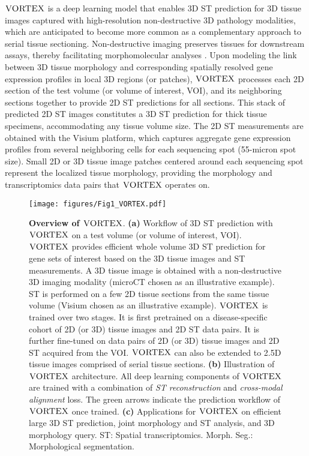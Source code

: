 

$\textsc{VORTEX}$ is a deep learning model that enables 3D ST prediction for 3D tissue images captured with high-resolution non-destructive 3D pathology modalities\cite{liu2021harnessing, song2024analysis, wang20243d}, which are anticipated to become more common as a complementary approach to serial tissue sectioning\cite{kiemen2022coda, braxton20243d}. Non-destructive imaging preserves tissues for downstream assays, thereby facilitating morphomolecular analyses \cite{bishop2024end, li2023feasibility}.
Upon modeling the link between 3D tissue morphology and corresponding spatially resolved gene expression profiles in local 3D regions (or patches), $\textsc{VORTEX}$ processes each 2D section of the test volume (or volume of interest, VOI), and its neighboring sections together to provide 2D ST predictions for all sections. This stack of predicted 2D ST images constitutes a 3D ST prediction for thick tissue specimens, accommodating any tissue volume size.
The 2D ST measurements are obtained with the Visium platform\cite{staahl2016visualization, rao2021exploring}, which captures aggregate gene expression profiles from several neighboring cells for each sequencing spot (55-micron spot size). Small 2D or 3D tissue image patches centered around each sequencing spot represent the localized tissue morphology, providing the morphology and transcriptomics data pairs that $\textsc{VORTEX}$ operates on.


\begin{figure*}
\centering %
\texttt{[image: figures/Fig1\_VORTEX.pdf]}
\caption{\textbf{Overview of $\textsc{VORTEX}$}. 
\textbf{(a)} Workflow of 3D ST prediction with $\textsc{VORTEX}$ on a test volume (or volume of interest, VOI). $\textsc{VORTEX}$ provides efficient whole volume 3D ST prediction for gene sets of interest based on the 3D tissue images and ST measurements. A 3D tissue image is obtained with a non-destructive 3D imaging modality (microCT chosen as an illustrative example). ST is performed on a few 2D tissue sections from the same tissue volume (Visium chosen as an illustrative example).  $\textsc{VORTEX}$ is trained over two stages. It is first pretrained on a disease-specific cohort of 2D (or 3D) tissue images and 2D ST data pairs. It is further fine-tuned on data pairs of 2D (or 3D) tissue images and 2D ST acquired from the VOI. $\textsc{VORTEX}$ can also be extended to 2.5D tissue images comprised of serial tissue sections.
\textbf{(b)} Illustration of $\textsc{VORTEX}$ architecture. All deep learning components of $\textsc{VORTEX}$ are trained with a combination of \textit{ST reconstruction} and \textit{cross-modal alignment} loss. The green arrows indicate the prediction workflow of $\textsc{VORTEX}$ once trained.
\textbf{(c)} Applications for $\textsc{VORTEX}$ on efficient large 3D ST prediction, joint morphology and ST analysis, and 3D morphology query. ST: Spatial transcriptomics. Morph. Seg.: Morphological segmentation.
}
\label{fig:main}
\end{figure*} 

